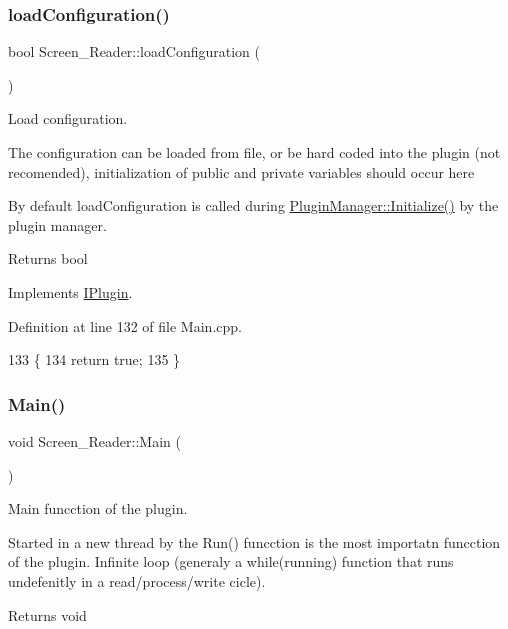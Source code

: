 \subsubsection{\texorpdfstring{load\+Configuration()}{loadConfiguration()}}
{\footnotesize\ttfamily bool Screen\+\_\+\+Reader\+::load\+Configuration (\begin{DoxyParamCaption}{ }\end{DoxyParamCaption})\hspace{0.3cm}{\ttfamily [virtual]}}



Load configuration. 

The configuration can be loaded from file, or be hard coded into the plugin (not recomended), initialization of public and private variables should occur here

By default load\+Configuration is called during \hyperlink{class_plugin_manager_a956e653b7db36da9d034b4a93c8308d5}{Plugin\+Manager\+::\+Initialize()} by the plugin manager.

\begin{DoxyReturn}{Returns}
bool 
\end{DoxyReturn}


Implements \hyperlink{class_i_plugin_a418cff309436d3a15d9a4ce7369db6dd}{I\+Plugin}.



Definition at line 132 of file Main.\+cpp.


\begin{DoxyCode}
133 \{
134     \textcolor{keywordflow}{return} \textcolor{keyword}{true};
135 \}
\end{DoxyCode}
\mbox{\label{class_screen___reader_add5cdfdc432ed5e8baa6683213c6daba}} 
\subsubsection{\texorpdfstring{Main()}{Main()}}
{\footnotesize\ttfamily void Screen\+\_\+\+Reader\+::\+Main (\begin{DoxyParamCaption}{ }\end{DoxyParamCaption})\hspace{0.3cm}{\ttfamily [virtual]}}



Main funcction of the plugin. 

Started in a new thread by the Run() funcction is the most importatn funcction of the plugin. Infinite loop (generaly a while(running) function that runs undefenitly in a read/process/write cicle). \begin{DoxyReturn}{Returns}
void 
\end{DoxyReturn}


